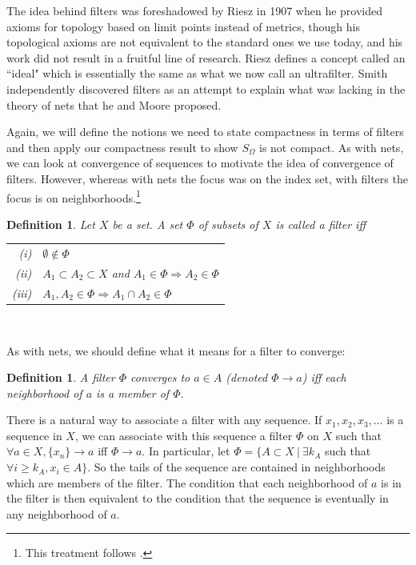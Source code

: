 \documentclass[12pt]{article}
\newtheorem{dfn}[thm]{Definition}
\begin{document}
The idea behind filters was foreshadowed by Riesz \cite{ries} in 1907 when he provided axioms for topology based on limit
points instead of metrics, though his topological axioms are not equivalent to the standard
ones we use today, and his work did not result in a fruitful line of research. Riesz defines a concept 
called an ``ideal"  which is essentially the same as what we now call an ultrafilter. Smith independently discovered filters as an attempt to explain what was lacking in the theory of nets
that he and Moore proposed. 



Again, we will define the notions we need to state compactness in terms of filters and
then apply our compactness result to show  $S_\Omega$ is not compact. As with nets,
we can look at convergence of sequences to motivate the idea of convergence of
filters. However, whereas with nets the focus was on the index set, with filters the
focus is on neighborhoods.\footnote{This treatment follows \cite{dixm}.}  

\begin{dfn}
Let $X$ be a set. A set $\Phi$  of subsets of $X$ is called a {\em filter} iff
\begin{tabular}{r@{  }l}
  (i)  & $\emptyset \notin \Phi$\\
  (ii) &  $A_1 \subset A_2 \subset X$ and $A_1 \in \Phi \Rightarrow A_2 \in
\Phi$\\
  (iii) &  $A_1, A_2 \in \Phi \Rightarrow A_1 \cap A_2 \in \Phi$
\end{tabular}\\
\end{dfn}

As with nets, we should define what it means for a filter to converge:

\begin{dfn}
A filter $\Phi$  converges to $a \in A$ (denoted $\Phi \rightarrow a$)  iff each
neighborhood of $a$  is a member of  $\Phi$.

\end{dfn}

There is a natural way to associate a filter with any sequence. If $x_1, x_2, x_3,
\ldots$  is a sequence in $X$, we can associate with this sequence a filter $\Phi$ on
$X$ such that  $\forall a \in X, \{x_n\} \rightarrow a$ iff $\Phi \rightarrow a$. In
particular, let $\Phi=\{A \subset X \:|\: \exists k_A$ such that $\forall i\geq k_A,
x_i \in A\}$. So the tails of the sequence are contained in neighborhoods which are members of the
filter. The condition that each neighborhood of $a$ is in the filter is then
equivalent to the condition that the sequence is eventually in any neighborhood of
$a$.
\end{document}
